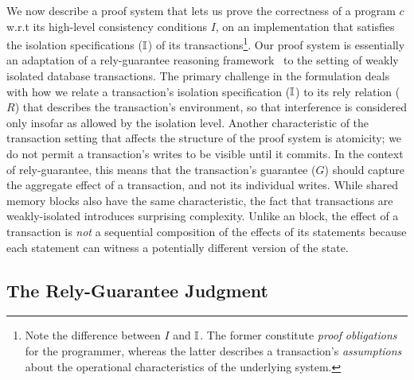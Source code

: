 We now describe a proof system that lets us prove the correctness of a
\txnimp program $c$ w.r.t its high-level consistency conditions $I$,
on an implementation that satisfies the isolation specifications
($\mathbb{I}$) of its transactions\footnote{Note the difference between $I$
  and $\mathbb{I}$. The former constitute \emph{proof} \emph{obligations} for
  the programmer, whereas the latter describes a transaction's
  \emph{assumptions} about the operational characteristics of the
  underlying system.}.  Our proof system is essentially an adaptation
of a rely-guarantee reasoning framework~\cite{rgjones} to the setting
of weakly isolated database transactions.  The primary challenge in
the formulation deals with how we relate a transaction's isolation
specification ($\mathbb{I}$) to its rely relation ($R$) that describes the
transaction's environment, so that interference is considered only
insofar as allowed by the isolation level.  Another characteristic of
the transaction setting that affects the structure of the proof system
is atomicity; we do not permit a transaction's writes to be visible
until it commits.  In the context of rely-guarantee, this means that
the transaction's guarantee ($G$) should capture the aggregate effect
of a transaction, and not its individual writes.  While shared memory
 blocks also have the same characteristic, the fact that
transactions are weakly-isolated introduces surprising complexity.
Unlike an  block, the effect of a transaction is \emph{not}
a sequential composition of the effects of its statements because each
statement can witness a potentially different version of the state.

\subsection{The Rely-Guarantee Judgment}
\label{sec:rely-guarantee}



